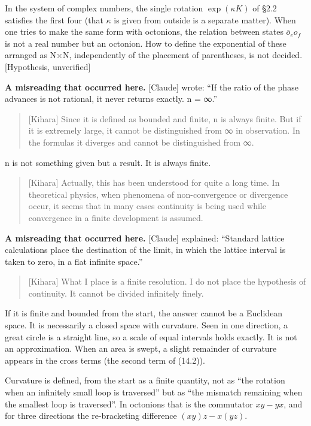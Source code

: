 \documentclass[
  a4paper,
]{article}
\begin{document}
In the system of complex numbers, the single rotation \(\exp(\kappa K)\)
of §2.2 satisfies the first four (that \(\kappa\) is given from outside
is a separate matter). When one tries to make the same form with
octonions, the relation between states \(\bar o_e o_f\) is not a real
number but an octonion. How to define the exponential of these arranged
as N×N, independently of the placement of parentheses, is not decided.
{[}Hypothesis, unverified{]}

\textbf{A misreading that occurred here.} {[}Claude{]} wrote: ``If the
ratio of the phase advances is not rational, it never returns exactly. n
= ∞.''

\begin{quote}
{[}Kihara{]} Since it is defined as bounded and finite, n is always
finite. But if it is extremely large, it cannot be distinguished from ∞
in observation. In the formulas it diverges and cannot be distinguished
from ∞.
\end{quote}

n is not something given but a result. It is always finite.

\begin{quote}
{[}Kihara{]} Actually, this has been understood for quite a long time.
In theoretical physics, when phenomena of non-convergence or divergence
occur, it seems that in many cases continuity is being used while
convergence in a finite development is assumed.
\end{quote}

\textbf{A misreading that occurred here.} {[}Claude{]} explained:
``Standard lattice calculations place the destination of the limit, in
which the lattice interval is taken to zero, in a flat infinite space.''

\begin{quote}
{[}Kihara{]} What I place is a finite resolution. I do not place the
hypothesis of continuity. It cannot be divided infinitely finely.
\end{quote}

If it is finite and bounded from the start, the answer cannot be a
Euclidean space. It is necessarily a closed space with curvature. Seen
in one direction, a great circle is a straight line, so a scale of equal
intervals holds exactly. It is not an approximation. When an area is
swept, a slight remainder of curvature appears in the cross terms (the
second term of (14.2)).

Curvature is defined, from the start as a finite quantity, not as ``the
rotation when an infinitely small loop is traversed'' but as ``the
mismatch remaining when the smallest loop is traversed''. In octonions
that is the commutator \(xy - yx\), and for three directions the
re-bracketing difference \((xy)z - x(yz)\).
\end{document}
